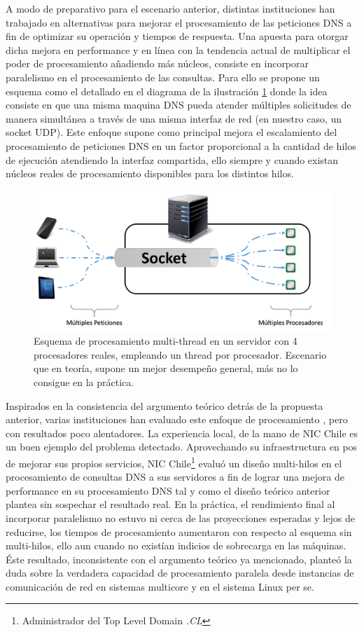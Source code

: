 A modo de preparativo para el escenario anterior, distintas instituciones han trabajado en alternativas para mejorar el procesamiento de las peticiones DNS a fin de optimizar su operación y tiempos de respuesta. Una apuesta para otorgar dicha mejora en performance y en línea con la tendencia actual de multiplicar el poder de procesamiento añadiendo más núcleos, consiste en incorporar paralelismo en el procesamiento de las consultas. Para ello se propone un esquema como el detallado en el diagrama de la ilustración \ref{fig:multi_thread} donde la idea consiste en que una misma maquina DNS pueda atender múltiples solicitudes de manera simultánea a través de una misma interfaz de red (en nuestro caso, un socket UDP). Este enfoque supone como principal mejora el escalamiento del procesamiento de peticiones DNS en un factor proporcional a la cantidad de hilos de ejecución atendiendo la interfaz compartida, ello siempre y cuando existan núcleos reales de procesamiento disponibles para los distintos hilos. 

\begin{figure}[!h]
	\centering
	\includegraphics[scale=0.45]{imagenes/conf_multi_thread}
	\caption{Esquema de procesamiento multi-thread en un servidor con 4 procesadores reales, empleando un thread por procesador. Escenario que en teoría, supone un mejor desempeño general, más no lo consigue en la práctica.}
	\label{fig:multi_thread}
\end{figure}

Inspirados en la consistencia del argumento teórico detrás de la propuesta anterior, varias instituciones han evaluado este enfoque de procesamiento \cite{post:facebook, paper:toshiba}, pero con resultados poco alentadores. La experiencia local, de la mano de NIC Chile es un buen ejemplo del problema detectado. Aprovechando su infraestructura en pos de mejorar sus propios servicios, NIC Chile\footnote{Administrador del Top Level Domain \emph{.CL}} evaluó un diseño multi-hilos en el procesamiento de consultas DNS a sus servidores a fin de lograr una mejora de performance en su procesamiento DNS tal y como el diseño teórico anterior plantea sin sospechar el resultado real. En la práctica, el rendimiento final al incorporar paralelismo no estuvo ni cerca de las proyecciones esperadas y lejos de reducirse, los tiempos de procesamiento aumentaron con respecto al esquema sin multi-hilos, ello aun cuando no existían indicios de sobrecarga en las máquinas. Éste resultado, inconsistente con el argumento teórico ya mencionado, planteó la duda sobre la verdadera capacidad de procesamiento paralela desde instancias de comunicación de red en sistemas multicore y en el sistema Linux per se.

